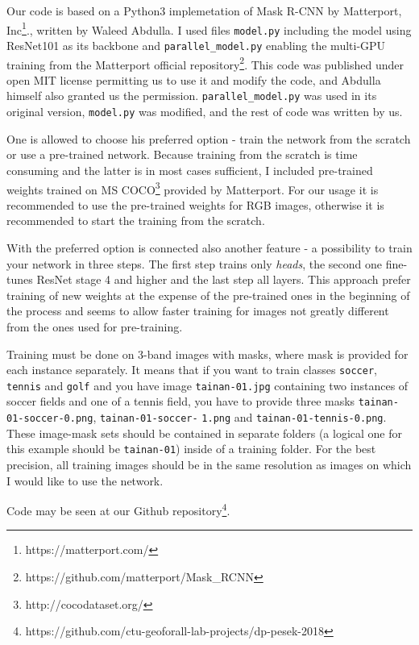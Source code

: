\documentclass[journal, onecolumn, a4paper]{IEEEtran}
\begin{document}
Our code is based on a Python3 implemetation of Mask R-CNN by Matterport, Inc\footnote{https://matterport.com/}., written by Waleed Abdulla. I used files \verb|model.py| including the model using ResNet101 as its backbone and \verb|parallel_model.py| enabling the multi-GPU training from the Matterport official repository\footnote{https://github.com/matterport/Mask\_RCNN}. This code was published under open MIT license permitting us to use it and modify the code, and Abdulla himself also granted us the permission. \verb|parallel_model.py| was used in its original version, \verb|model.py| was modified, and the rest of code was written by us. 

One is allowed to choose his preferred option - train the network from the scratch or use a pre-trained network. Because training from the scratch is time consuming and the latter is in most cases sufficient, I included pre-trained weights trained on MS COCO\footnote{http://cocodataset.org/} provided by Matterport. For our usage it is recommended to use the pre-trained weights for RGB images, otherwise it is recommended to start the training from the scratch. 

With the preferred option is connected also another feature - a possibility to train your network in three steps. The first step trains only \textit{heads}, the second one fine-tunes ResNet stage 4 and higher and the last step all layers. This approach prefer training of new weights at the expense of the pre-trained ones in the beginning of the process and seems to allow faster training for images not greatly different from the ones used for pre-training. 

Training must be done on 3-band images with masks, where mask is provided for each instance separately. It means that if you want to train classes \verb|soccer|, \verb|tennis| and \verb|golf| and you have image \verb|tainan-01.jpg| containing two instances of soccer fields and one of a tennis field, you have to provide three masks \verb|tainan-01-soccer-0.png|, \verb|tainan-01-soccer-| \verb|1.png| and \verb|tainan-01-tennis-0.png|. These image-mask sets should be contained in separate folders (a logical one for this example should be \verb|tainan-01|) inside of a training folder. For the best precision, all training images should be in the same resolution as images on which I would like to use the network. 

Code may be seen at our Github repository\footnote{https://github.com/ctu-geoforall-lab-projects/dp-pesek-2018}. 
\end{document}
